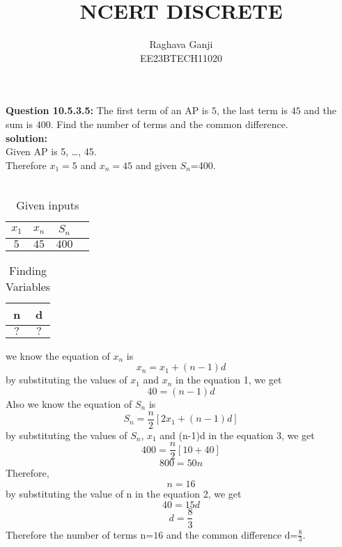 \documentclass[12pt]{article}
\title{NCERT DISCRETE}
\author{Raghava Ganji\\EE23BTECH11020}
\date{}
\begin{document}
\maketitle
\textbf{Question 10.5.3.5:}
The first term of an AP is $5$, the last term is $45$ and the sum is $400$. Find the number of terms and the common difference.\\
\textbf{solution:}\\
Given AP is 5, \ldots, 45.\\
Therefore  $x_1=5$ and $x_n=45$ and given $S_n$=400.\\\\
\begin{table}[H]
\centering
\begin{tabular}{|c|c|c|c|}\hline
$x_1$ & $x_n$ & $S_n$\\ \hline
$5$ & $45$ & $400$\\ \hline
\end{tabular}
\caption{Given inputs}
\end{table}
\begin{table}[H]
\centering
\begin{tabular}{|c|c|}\hline
n & d\\ \hline
$?$ &$?$\\ \hline
\end{tabular}
\caption{Finding Variables}
\end{table}
we know the equation of $x_n$ is
\begin{equation}
\tag{1}
x_n=x_1+(n-1)d
\end{equation}
by substituting the values of $x_1$ and $x_n$ in the equation 1, we get
\begin{equation}
\tag{2}
40=(n-1)d
\end{equation}
Also we know the equation of $S_n$ is
\begin{equation}
\tag{3}
S_n=\frac{n}{2} [2x_1+(n-1)d]
\end{equation}
by substituting the values of $S_n$, $x_1$ and (n-1)d in the equation 3, we get
\begin{equation}
\tag{4}
400=\frac{n}{2} [10+40]
\end{equation}
\begin{equation}
\tag{5}
800=50n
\end{equation}
Therefore,
\begin{equation}
\tag{6}
n=16
\end{equation}
by substituting the value of n in the equation 2, we get
\begin{equation}
\tag{7}
40=15d
\end{equation}
\begin{equation}
\tag{8}
d=\frac{8}{3}
\end{equation}
Therefore the number of terms n=$16$ and the common difference d=$\frac{8}{3}$.
\end{document}
